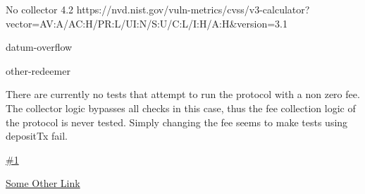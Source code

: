 \vuln
    { %
      No collector
    }
    { %
      4.2
    }
    { %
      https://nvd.nist.gov/vuln-metrics/cvss/v3-calculator?vector=AV:A/AC:H/PR:L/UI:N/S:U/C:L/I:H/A:H&version=3.1
    }
    { %
    \item datum-overflow
    \item other-redeemer
    }
    { %
    There are currently no tests that attempt to run the protocol with a non zero fee. The collector logic bypasses all checks in this case, thus the fee collection logic of the protocol is never tested. Simply changing the fee seems to make tests using depositTx fail.
    }
    { %
      
    }
    { %
    \item\href{github.com}{\#1}
    \item\href{github.com}{Some Other Link}
    }
